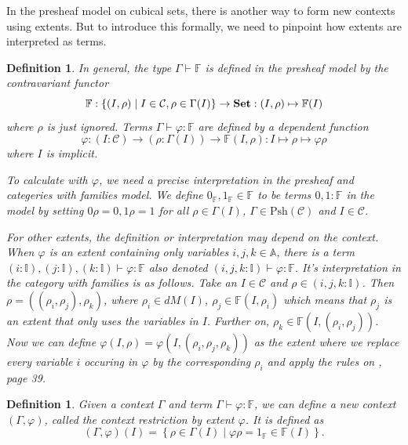 \documentclass[12pt,a4paper,twoside,xetex]{book}
\newcommand{\keyword}[1]{\emph{#1}\index{#1}}
\newtheorem{definition}[theorem]{Definition}
\newcommand{\Psh}[1]{\text{Psh}\left(#1\right)}
\begin{document}
In the presheaf model on cubical sets, there is another way to form new contexts using extents. But to introduce this formally, we need to pinpoint how extents are interpreted as terms.

\begin{definition}
In general, the type $\Gamma \vdash \mathbb{F}$ is defined in the presheaf model by the contravariant functor $$\mathbb{F} : \left\{ (I, \rho) \mid  I \in \mathcal{C},  \rho \in \Gamma (I) \right\} \rightarrow \text{\textbf{Set}}: (I, \rho) \mapsto \mathbb{F}(I)$$ where $\rho$ is just ignored. Terms $\Gamma \vdash \varphi : \mathbb{F}$ are defined by a dependent function $$\varphi : (I : \mathcal{C}) \rightarrow (\rho : \Gamma (I)) \rightarrow  \mathbb{F}(I,\rho): I \mapsto \rho \mapsto \varphi \rho $$ where $I$ is implicit.

To calculate with $\varphi$, we need a precise interpretation in the presheaf and categeries with families model. We define $ 0_{\mathbb{F}}, 1_{\mathbb{F}} \in \mathbb{F}$ to be terms $0,1 : \mathbb{F}$ in the model by setting \(0 \rho = 0, 1 \rho = 1\) for all $\rho \in \Gamma (I)$, $\Gamma \in \Psh{\mathcal{C}}$ and $I \in \mathcal{C}$.  

For other extents, the definition or interpretation may depend on the context. When $\varphi$ is an extent containing only variables $i,j,k \in \mathbb{A}$, there is a term $(i: \mathbb{I}), (j: \mathbb{I}), (k: \mathbb{I}) \vdash \varphi : \mathbb{F}$ also denoted $(i,j,k: \mathbb{I}) \vdash \varphi : \mathbb{F}$. It's interpretation in the category with families is as follows. Take an $I \in \mathcal{C}$ and  $\rho \in (i,j,k: \mathbb{I})$. Then $\rho = ((\rho_i, \rho_j), \rho_k)$, where $\rho_i \in dM(I)$, $\rho_j \in \mathbb{F}(I,\rho_i)$ which means that $\rho_j$ is an extent that only uses the variables in $I$. Further on, $\rho_k \in \mathbb{F}(I, (\rho_i, \rho_j))$. Now we can define $\varphi(I,\rho)=\varphi(I,(\rho_i,\rho_j,\rho_k))$ as the extent where we replace every variable $i$ occuring in $\varphi$ by the corresponding $\rho_i$ and apply the rules on \cite{Orton2019}, page 39.
\end{definition}



\begin{definition}\label{contextrestriction}
Given a context $\Gamma$ and term $\Gamma \vdash \varphi : \mathbb{F}$, we can define a new context $(\Gamma , \varphi)$, called the \keyword{context restriction by extent $\varphi$}. It is defined as  $$(\Gamma , \varphi)(I) = \left\{ \rho \in \Gamma (I) \mid \varphi \rho = 1_{\mathbb{F}} \in \mathbb{F}(I) \right \} .$$
\end{definition}
 
\end{document}
